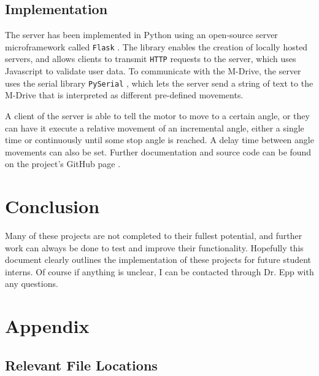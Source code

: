 \documentclass{article}
\begin{document}
    \subsection{Implementation} \label{m-drive_implementation}
    
    The server has been implemented in Python using an open-source server microframework called \texttt{Flask} \cite{flask}. The library enables the creation of locally hosted servers, and allows clients to transmit \texttt{HTTP} requests to the server, which uses Javascript to validate user data. To communicate with the M-Drive, the server uses the serial library \texttt{PySerial} \cite{pyserial}, which lets the server send a string of text to the M-Drive that is interpreted as different pre-defined movements. 
    
    A client of the server is able to tell the motor to move to a certain angle, or they can have it execute a relative movement of an incremental angle, either a single time or continuously until some stop angle is reached. A delay time between angle movements can also be set. Further documentation and source code can be found on the project's GitHub page \cite{m-drive_github}.

\section{Conclusion} \label{conclusion}

    Many of these projects are not completed to their fullest potential, and further work can always be done to test and improve their functionality. Hopefully this document clearly outlines the implementation of these projects for future student interns. Of course if anything is unclear, I can be contacted through Dr. Epp with any questions.
    
\pagebreak

\section{Appendix} \label{appendix}

    \subsection{Relevant File Locations}
    
\end{document}
